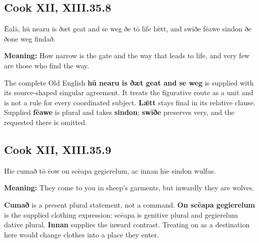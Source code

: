 \par\begin{minipage}{\linewidth}\raggedright
\subsection*{Cook XII, XIII.35.8}

Ēalā, hū nearu is ðæt geat and se weg ðe tō līfe lǣtt, and swīðe fēawe sindon ðe ðone weg findað.

\textbf{Meaning:} How narrow is the gate and the way that leads to life, and very few are those who find the way.

The complete Old English \textbf{hū nearu is ðæt geat and se weg} is supplied with its source-shaped singular agreement. It treats the figurative route as a unit and is not a rule for every coordinated subject. \textbf{Lǣtt} stays final in its relative clause. Supplied \textbf{fēawe} is plural and takes \textbf{sindon}; \textbf{swīðe} preserves very, and the requested there is omitted.

\end{minipage}\par\addvspace{4pt}

\par\begin{minipage}{\linewidth}\raggedright
\subsection*{Cook XII, XIII.35.9}

Hīe cumað tō ēow on scēapa gegierelum, ac innan hīe sindon wulfas.

\textbf{Meaning:} They come to you in sheep’s garments, but inwardly they are wolves.

\textbf{Cumað} is a present plural statement, not a command. \textbf{On scēapa gegierelum} is the supplied clothing expression: scēapa is genitive plural and gegierelum dative plural. \textbf{Innan} supplies the inward contrast. Treating on as a destination here would change clothes into a place they enter.

\end{minipage}\par\addvspace{4pt}

